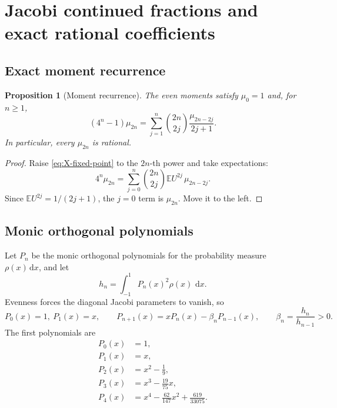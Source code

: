 \documentclass[11pt]{article}
\newtheorem{proposition}[theorem]{Proposition}
\theoremstyle{definition}
\theoremstyle{remark}
\newcommand{\E}{\mathbb E}
\newcommand{\dd}{\,\mathrm d}
\begin{document}
\section{Jacobi continued fractions and exact rational coefficients}\label{sec:jacobi}

\subsection{Exact moment recurrence}

\begin{proposition}[Moment recurrence]\label{prop:moment-recurrence}
The even moments satisfy \(\mu_0=1\) and, for \(n\ge1\),
\begin{equation}
 \boxed{
 (4^n-1)\mu_{2n}
 =\sum_{j=1}^{n}\binom{2n}{2j}\frac{\mu_{2n-2j}}{2j+1}.
 }                                                           \label{eq:moment-recurrence}
\end{equation}
In particular, every \(\mu_{2n}\) is rational.
\end{proposition}

\begin{proof}
Raise \eqref{eq:X-fixed-point} to the \(2n\)-th power and take expectations:
\[
 4^n\mu_{2n}
 =\sum_{j=0}^{n}\binom{2n}{2j}\E U^{2j}\,\mu_{2n-2j}.
\]
Since \(\E U^{2j}=1/(2j+1)\), the \(j=0\) term is \(\mu_{2n}\).  Move it to the left.
\end{proof}

\subsection{Monic orthogonal polynomials}

Let \(P_n\) be the monic orthogonal polynomials for the probability measure
\(\rho(x)\dd x\), and let
\begin{equation}
 h_n=\int_{-1}^{1}P_n(x)^2\rho(x)\,\dd x.                    \label{eq:hn}
\end{equation}
Evenness forces the diagonal Jacobi parameters to vanish, so
\begin{equation}
 P_0(x)=1,\
 P_1(x)=x,
 \qquad
 P_{n+1}(x)=xP_n(x)-\beta_nP_{n-1}(x),
 \qquad
 \beta_n=\frac{h_n}{h_{n-1}}>0.                              \label{eq:monic-recurrence}
\end{equation}
The first polynomials are
\begin{align}
 P_0(x)&=1,\\
 P_1(x)&=x,\\
 P_2(x)&=x^2-\frac19,\\
 P_3(x)&=x^3-\frac{19}{75}x,\\
 P_4(x)&=x^4-\frac{62}{147}x^2+\frac{619}{33075}.
\end{align}
\end{document}
